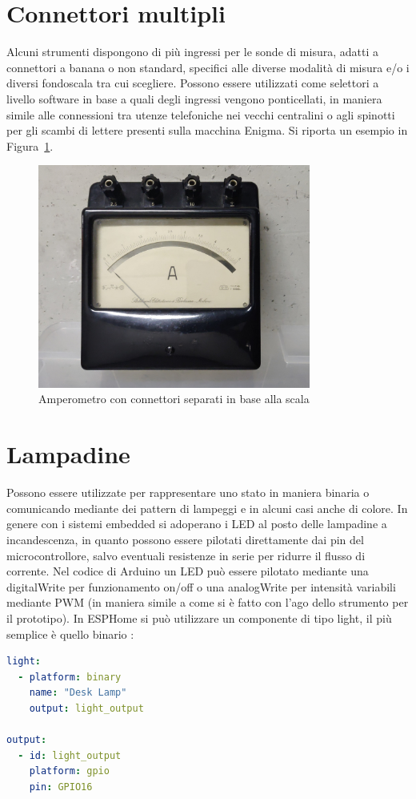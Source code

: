 \documentclass[12pt,a4paper]{report}
\begin{document}
\section{Connettori multipli}
Alcuni strumenti dispongono di più ingressi per le sonde di misura, adatti a connettori a banana o non standard, specifici alle
diverse modalità di misura e/o i diversi fondoscala tra cui scegliere. Possono essere utilizzati come selettori a livello software in base a
quali degli ingressi vengono ponticellati, in maniera simile alle connessioni tra utenze telefoniche nei vecchi centralini o agli spinotti per
gli scambi di lettere presenti sulla macchina Enigma. Si riporta un esempio in Figura~\ref{fig:connettorimultipli}.

\begin{figure}[h]
  \centering
  \includegraphics[width=0.8\textwidth]{connettorimultipli}
  \caption{Amperometro con connettori separati in base alla scala}
  \label{fig:connettorimultipli}
\end{figure}

\section{Lampadine}
Possono essere utilizzate per rappresentare uno stato in maniera binaria o comunicando mediante dei pattern di lampeggi e in alcuni
casi anche di colore.
In genere con i sistemi embedded si adoperano i LED al posto delle lampadine a incandescenza, in quanto possono essere pilotati
direttamente dai pin del microcontrollore, salvo eventuali resistenze in serie per ridurre il flusso di corrente.
Nel codice di Arduino un LED può essere pilotato mediante una digitalWrite per funzionamento on/off o una analogWrite per
intensità variabili mediante PWM (in maniera simile a come si è fatto con l'ago dello strumento per il prototipo).
In ESPHome si può utilizzare un componente di tipo light, il più semplice è quello binario \cite{esphomeio}:
\begin{lstlisting}[language=yaml]
light:
  - platform: binary
    name: "Desk Lamp"
    output: light_output

output:
  - id: light_output
    platform: gpio
    pin: GPIO16
\end{lstlisting}
\end{document}
